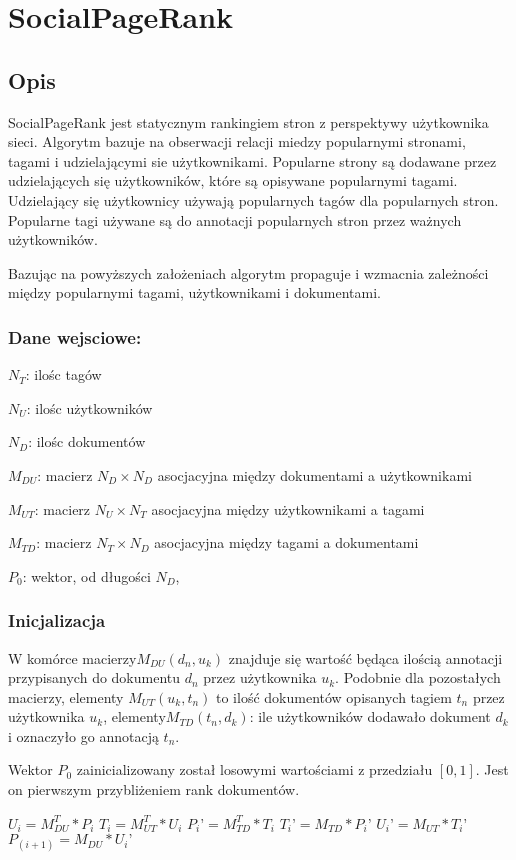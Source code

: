 \chapter{SocialPageRank}
\section{Opis}
SocialPageRank jest statycznym rankingiem stron z perspektywy użytkownika sieci. Algorytm bazuje na obserwacji relacji miedzy popularnymi stronami, tagami i udzielającymi sie użytkownikami. Popularne strony są dodawane przez udzielających się użytkowników, które są opisywane popularnymi tagami. Udzielający się użytkownicy używają popularnych tagów dla popularnych stron. Popularne tagi używane są do annotacji popularnych stron przez ważnych użytkowników.

Bazując na powyższych założeniach algorytm propaguje i wzmacnia zależności między popularnymi tagami, użytkownikami i dokumentami. 
\subsection*{Dane wejsciowe:}
$N_T$: ilośc tagów

$N_U$: ilośc użytkowników

$N_D$: ilośc dokumentów

$M_{DU}$: macierz $N_D \times N_D$ asocjacyjna między dokumentami a użytkownikami

$M_{UT}$: macierz $N_U \times N_T$  asocjacyjna między użytkownikami a tagami

$M_{TD}$: macierz $N_T \times N_D$ asocjacyjna między tagami a dokumentami

$P_0$: wektor, od długości $N_D$, 

\subsection*{Inicjalizacja}
W komórce macierzy$M_{DU}(d_n, u_k)$ znajduje się wartość będąca ilością annotacji przypisanych do dokumentu $d_n$ przez użytkownika $u_k$. Podobnie dla pozostałych macierzy, elementy $M_{UT}(u_k, t_n)$ to ilość dokumentów opisanych tagiem $t_n$ przez użytkownika $u_k$, elementy$M_{TD}(t_n, d_k)$: ile użytkowników dodawało dokument $d_k$ i oznaczyło go annotacją $t_n$. 

Wektor $P_0$ zainicializowany został losowymi wartościami z przedziału $[0,1]$. Jest on pierwszym przybliżeniem rank dokumentów.


\begin{algorithmic}
\REPEAT
\STATE $U_i = M_{DU}^T * P_i$
\STATE $T_i = M_{UT}^T * U_i$
\STATE $P_i’ = M_{TD}^T * T_i$
\STATE $T_i’ = M_{TD}  * P_i’$
\STATE $U_i’ = M_{UT} * T_i’$
\STATE $P_(i+1) = M_{DU} * U_i’$
\end{algorithmic}



